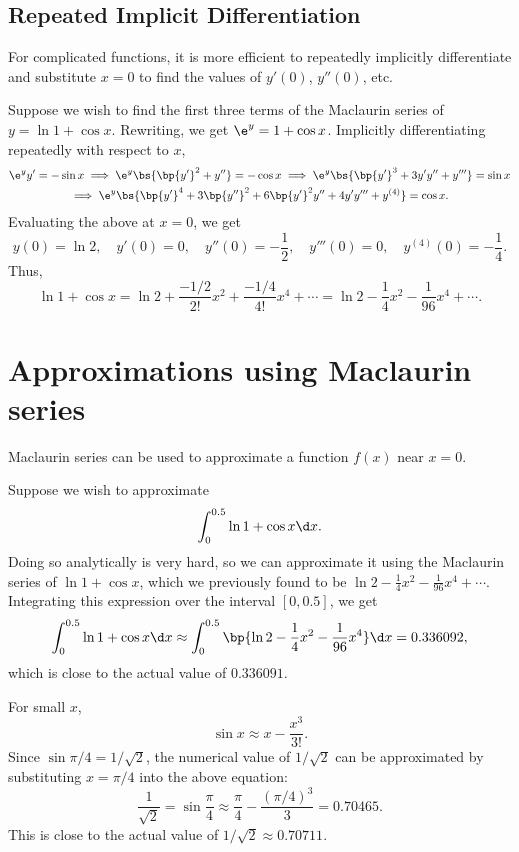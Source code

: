 \subsection{Repeated Implicit Differentiation}

For complicated functions, it is more efficient to repeatedly implicitly differentiate and substitute $x = 0$ to find the values of $y'(0)$, $y''(0)$, etc.

\begin{example}
    Suppose we wish to find the first three terms of the Maclaurin series of $y = \ln{1 + \cos x}$. Rewriting, we get $\e^y = 1 + \cos x$. Implicitly differentiating repeatedly with respect to $x$,
    \begin{gather*}
        \e^y y' = -\sin x \implies \e^y \bs{\bp{y'}^2 + y''} = -\cos x \implies \e^y \bs{\bp{y'}^3 + 3y'y'' + y'''} = \sin x \\
        \implies \e^y \bs{\bp{y'}^4 + 3\bp{y''}^2 + 6\bp{y'}^2 y'' + 4y'y''' + y^{(4)}} = \cos x.
    \end{gather*}
    Evaluating the above at $x = 0$, we get \[y(0) = \ln 2, \quad y'(0) = 0, \quad y''(0) = -\frac12, \quad y'''(0) = 0, \quad y^{(4)}(0) = -\frac14.\] Thus, \[\ln{1 + \cos x} = \ln 2 + \frac{-1/2}{2!} x^2 + \frac{-1/4}{4!} x^4 + \cdots = \ln 2 - \frac14 x^2 - \frac1{96}x^4 + \cdots.\]
\end{example}

\section{Approximations using Maclaurin series}

Maclaurin series can be used to approximate a function $f(x)$ near $x = 0$.

\begin{example}
    Suppose we wish to approximate \[\int_0^{0.5} \ln{1 + \cos x} \d x.\] Doing so analytically is very hard, so we can approximate it using the Maclaurin series of $\ln{1 + \cos x}$, which we previously found to be $\ln 2 - \frac14 x^2 - \frac1{96}x^4 + \cdots$. Integrating this expression over the interval $[0, 0.5]$, we get \[\int_0^{0.5} \ln{1 + \cos x} \d x \approx \int_0^{0.5} \bp{\ln 2 - \frac14 x^2 - \frac1{96}x^4} \d x = 0.336092,\] which is close to the actual value of $0.336091$.
\end{example}

\begin{example}
    For small $x$, \[\sin x \approx x - \frac{x^3}{3!}.\] Since $\sin{\pi/4} = 1/\sqrt{2}$, the numerical value of $1/\sqrt{2}$ can be approximated by substituting $x = \pi/4$ into the above equation: \[\frac1{\sqrt2} = \sin \frac{\pi}4 \approx \frac{\pi}4 - \frac{(\pi/4)^3}{3} = 0.70465.\] This is close to the actual value of $1/\sqrt{2} \approx 0.70711$.
\end{example}

